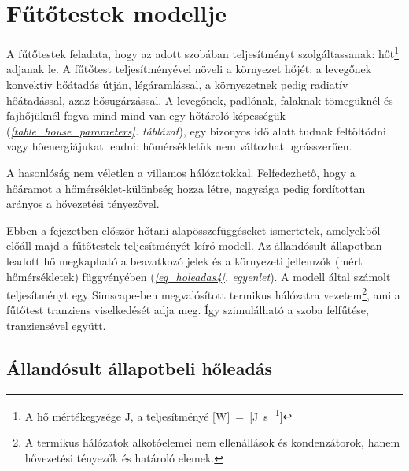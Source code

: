 \chapter{Fűtőtestek modellje}\label{chap:futotest}

A fűtőtestek feladata, hogy az adott szobában teljesítményt szolgáltassanak: hőt\footnote{A hő mértékegysége \si{\joule}, a teljesítményé [\si{\watt}]~=~[\si[per-mode=fraction]{\joule\per\second}]} adjanak le. A fűtőtest teljesítményével növeli a környezet hőjét:
a levegőnek konvektív hőátadás útján, légáramlással, a környezetnek pedig radiatív hőátadással, azaz hősugárzással.
A levegőnek, padlónak, falaknak tömegüknél és fajhőjüknél fogva mind-mind van egy hőtároló képességük (\textit{\ref{table_house_parameters}. táblázat}), egy bizonyos idő alatt tudnak feltöltődni vagy hőenergiájukat leadni: hőmérsékletük nem változhat ugrásszerűen. %

A hasonlóság nem véletlen a villamos hálózatokkal. Felfedezhető, hogy a hőáramot a hőmérséklet-különbség hozza létre, nagysága pedig fordítottan arányos a hővezetési tényezővel. 

Ebben a fejezetben először hőtani alapösszefüggéseket ismertetek, amelyekből előáll majd a fűtőtestek teljesítményét leíró modell. Az állandósult állapotban leadott hő megkapható a beavatkozó jelek és a környezeti jellemzők (mért hőmérsékletek) függvényében (\textit{\ref{eq_holeadas4}. egyenlet}).
A modell által számolt teljesítményt egy Simscape-ben megvalósított termikus hálózatra vezetem\footnote{A termikus hálózatok alkotóelemei nem ellenállások és kondenzátorok, hanem hővezetési tényezők és határoló elemek.}, ami a fűtőtest tranziens viselkedését adja meg. Így szimulálható a szoba felfűtése, tranziensével együtt.

\section{Állandósult állapotbeli hőleadás}\label{section:allandosult}

